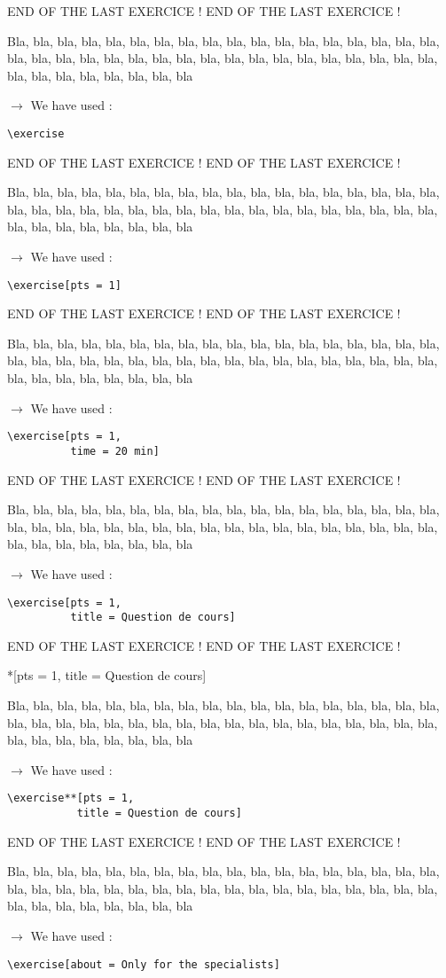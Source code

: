 \documentclass[12pt]{article}
\newcommand\blabla{%
		\noindent%
		Bla, bla, bla, bla, bla, bla, bla, bla, bla, bla, bla,
		bla, bla, bla, bla, bla, bla, bla, bla, bla, bla, bla,
		bla, bla, bla, bla, bla, bla, bla, bla, bla, bla, bla,
		bla, bla, bla, bla, bla, bla, bla, bla, bla, bla, bla
	}
\newcommand\codeused{%
		\blabla{} \medskip  \par
		\noindent $\rightarrow$ We have used :
	}
\begin{document}
\newpage \medskip \noindent END OF THE LAST EXERCICE ! END OF THE LAST EXERCICE !

\exercise

\codeused{}
\begin{verbatim}
\exercise
\end{verbatim}



\newpage \medskip \noindent END OF THE LAST EXERCICE ! END OF THE LAST EXERCICE !

\exercise[pts = 1]

\codeused{}
\begin{verbatim}
\exercise[pts = 1]
\end{verbatim}



\newpage \medskip \noindent END OF THE LAST EXERCICE ! END OF THE LAST EXERCICE !

\exercise[pts = 1, time = 20 min]

\codeused{}
\begin{verbatim}
\exercise[pts = 1,
          time = 20 min]
\end{verbatim}



\newpage \medskip \noindent END OF THE LAST EXERCICE ! END OF THE LAST EXERCICE !

\exercise[pts = 1,
          title = Question de cours]

\codeused{}
\begin{verbatim}
\exercise[pts = 1,
          title = Question de cours]
\end{verbatim}



\newpage \medskip \noindent END OF THE LAST EXERCICE ! END OF THE LAST EXERCICE !

\exercise**[pts = 1,
           title = Question de cours]

\codeused{}
\begin{verbatim}
\exercise**[pts = 1,
           title = Question de cours]
\end{verbatim}



\newpage \medskip \noindent END OF THE LAST EXERCICE ! END OF THE LAST EXERCICE !

\exercise[about = Only for the specialists]

\codeused{}
\begin{verbatim}
\exercise[about = Only for the specialists]
\end{verbatim}
\end{document}
